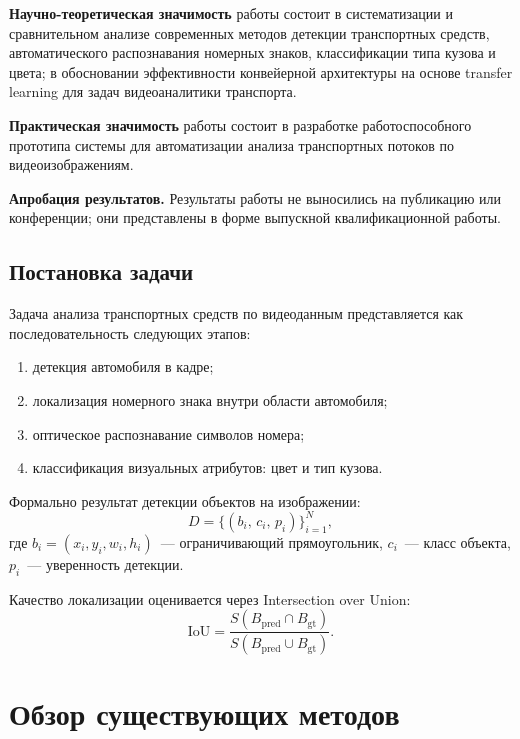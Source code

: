 \documentclass[10pt,a4paper]{report}
\numberwithin{equation}{chapter}
\numberwithin{figure}{chapter}
\numberwithin{table}{chapter}
\begin{document}
\textbf{Научно-теоретическая значимость} работы состоит в систематизации
и сравнительном анализе современных методов детекции транспортных средств,
автоматического распознавания номерных знаков, классификации типа кузова и цвета;
в обосновании эффективности конвейерной архитектуры на основе transfer learning
для задач видеоаналитики транспорта.

\textbf{Практическая значимость} работы состоит в разработке работоспособного
прототипа системы для автоматизации анализа транспортных потоков по видеоизображениям.

\textbf{Апробация результатов.} Результаты работы не выносились на публикацию
или конференции; они представлены в форме выпускной квалификационной работы.

\section*{Постановка задачи}

Задача анализа транспортных средств по видеоданным представляется как
последовательность следующих этапов:

\begin{enumerate}[nosep]
  \item детекция автомобиля в кадре;
  \item локализация номерного знака внутри области автомобиля;
  \item оптическое распознавание символов номера;
  \item классификация визуальных атрибутов: цвет и тип кузова.
\end{enumerate}

Формально результат детекции объектов на изображении:
\begin{equation*}
  D = \bigl\{(b_i,\, c_i,\, p_i)\bigr\}_{i=1}^{N},
\end{equation*}
где $b_i = (x_i, y_i, w_i, h_i)$~--- ограничивающий прямоугольник,
$c_i$~--- класс объекта, $p_i$~--- уверенность детекции.

Качество локализации оценивается через Intersection over Union:
\begin{equation*}
  \mathrm{IoU} = \frac{S(B_{\mathrm{pred}} \cap B_{\mathrm{gt}})}
                      {S(B_{\mathrm{pred}} \cup B_{\mathrm{gt}})}.
\end{equation*}

\chapter{Обзор существующих методов}
\end{document}
